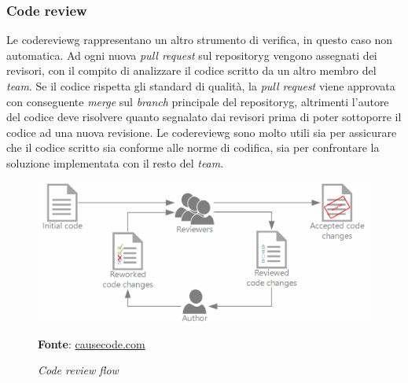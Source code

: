 \subsubsection{Code review}
Le \gls{codereviewg} rappresentano un altro strumento di verifica, in questo caso non automatica. Ad ogni nuova \textit{pull request} sul \gls{repositoryg} vengono assegnati dei revisori, con il compito di analizzare il codice scritto da un altro membro del \textit{team}. Se il codice rispetta gli standard di qualità, la \textit{pull request} viene approvata con conseguente \textit{merge} sul \textit{branch} principale del \gls{repositoryg}, altrimenti l'autore del codice deve risolvere quanto segnalato dai revisori prima di poter sottoporre il codice ad una nuova revisione. Le \gls{codereviewg} sono molto utili sia per assicurare che il codice scritto sia conforme alle norme di codifica, sia per confrontare la soluzione implementata con il resto del \textit{team}.

    \begin{figure}[ht]
        \centering
        \includegraphics[width=1\textwidth]{immagini/code_review.png}
        \caption{\textit{Code review flow}}
        \textbf{Fonte}:
        \href{https://storage.googleapis.com/causecode-wordpress-media/2019/01/97795825-code-review-process-1024x429.png}{causecode.com}
        \label{fig: Code review flow}
    \end{figure}

